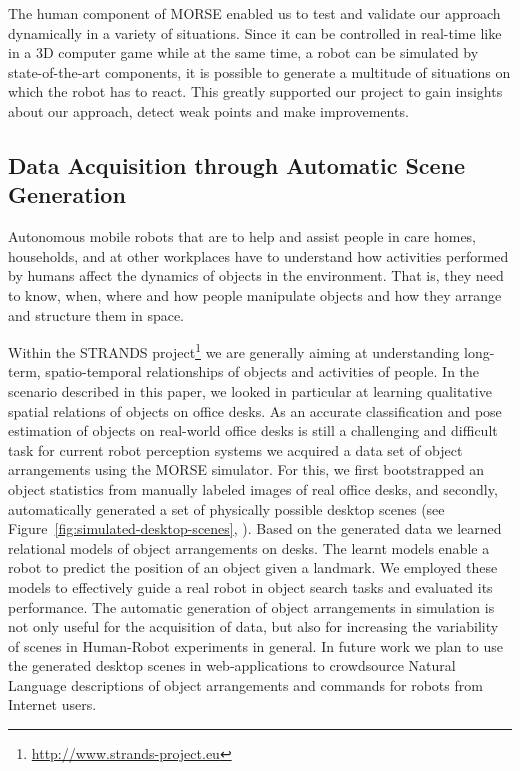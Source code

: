 \documentclass[conference]{IEEEtran}
\begin{document}
The human component of MORSE enabled us to test and validate our approach
dynamically in a variety of situations. Since it can be controlled in real-time
like in a 3D computer game while at the same time, a robot can be simulated by
state-of-the-art components, it is possible to generate a multitude of
situations on which the robot has to react. This greatly supported our project
to gain insights about our approach, detect weak points and make improvements.

\subsection{Data Acquisition through Automatic Scene Generation}
\label{scenario3}

Autonomous mobile robots that are to help and assist people in care homes,
households, and at other workplaces have to understand how activities performed
by humans affect the dynamics of objects in the environment. That is, they need
to know, when, where and how people manipulate objects and how they arrange and
structure them in space.

Within the STRANDS project\footnote{\url{http://www.strands-project.eu}} we are
generally aiming at understanding long-term, spatio-temporal relationships of
objects and activities of people. In the scenario described in this paper, we
looked in particular at learning qualitative spatial relations of objects on
office desks. As an accurate classification and pose estimation of objects on
real-world office desks is still a challenging and difficult task for current
robot perception systems we acquired a data set of object arrangements using
the MORSE simulator. For this, we first bootstrapped an object statistics from
manually labeled images of real office desks, and secondly, automatically
generated a set of physically possible desktop scenes (see
Figure~\ref{fig:simulated-desktop-scenes}, \cite{kunze14bootstrapping}). Based
on the generated data we learned relational models of object arrangements on
desks. The learnt models enable a robot to predict the position of an object
given a landmark. We employed these models to effectively guide a real robot in
object search tasks \cite{kunze14indirect} and evaluated its performance. The
automatic generation of object arrangements in simulation is not only useful
for the acquisition of data, but also for increasing the variability of scenes
in Human-Robot experiments in general. In future work we plan to use the
generated desktop scenes in web-applications to crowdsource Natural Language
descriptions of object arrangements and commands for robots from Internet
users.
\end{document}
